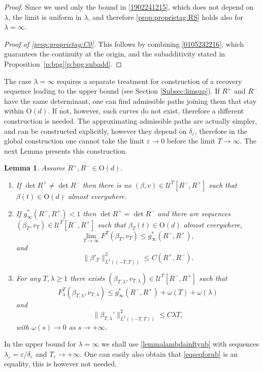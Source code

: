 \documentclass[a4paper,reqno]{amsart}
\newcommand\calU{\mathcal{U}}
\newcommand\eps{{\varepsilon}}
\newtheorem{lemma}[definition]{Lemma}
\theoremstyle{remark}
\newcommand{\On}{\mathrm{O}(d)}
\numberwithin{equation}{section}
\begin{document}
\begin{proof}
Since we used only the bound in
\eqref{1902241215}, which does not depend on $\lambda$, the limit is uniform in $\lambda$, and therefore \ref{prop:proprietag:RS} holds also for $\lambda=\infty$.
\medskip

\noindent \textit{Proof of \ref{prop:proprietag:C0}.} This follows by combining \eqref{0105232216}, which guarantees the continuity at the origin, and the subadditivity stated in
Proposition~\ref{p:bpg}\ref{p:bpg:subadd}.
\end{proof}


The case $\lambda=\infty$ requires a separate treatment for construction of a recovery sequence leading to the upper bound (see Section \ref{Subsec:limsup}). If $R^+$ and $R^-$ have the same determinant, one can find admissible paths joining them that stay within $\On$. If not, however, such curves do not exist, therefore a different construction is needed. The approximating admissible paths are actually simpler, and can be constructed explicitly, however they depend on $\delta_\eps$, therefore in the global construction one cannot take the limit $\eps\to0$ before the limit $T\to\infty$. The next Lemma presents this construction.
\begin{lemma}\label{lemmalambdainfty}
Assume $R^+, R^-\in\On$.
\begin{enumerate}
\item\label{lemmalambdainftyginfty} If $\det R^+\ne \det R^-$ then
there is no
  $(\beta,v)\in \calU^T[R^-,R^+]$ such that
  $\beta(t)\in \On$ almost everywhere.
 \item\label{lemmalambdainftyson}
 If $g_\infty^*(R^-,R^+)<1$ then
  $\det R^+=\det R^-$ and  there are sequences
  $(\beta_T,v_T)\in \calU^T[R^-,R^+]$ such that
  $\beta_T(t)\in \On$ almost everywhere,
  \begin{equation}
\lim_{T\to\infty} F^T(\beta_T, v_T)\leq    g_\infty^*(R^-,R^+),
  \end{equation}
  and \begin{equation}
           \|\beta'_T\|_{L^2((-T,T))}^2\le C(R^+, R^-).
          \end{equation}
  \item\label{lemmalambdainftyub}
  For any $T,\lambda \ge 1$  there exists $(\beta_{T,\lambda}, v_{T,\lambda})\in\calU^T[R^-,R^+]$ such that
  \begin{equation}\label{eqseqforub}
F^T_{\lambda}(\beta_{T,\lambda}, v_{T,\lambda}) 
   \le g_\infty^*(R^-,R^+) +\omega(T)+\omega(\lambda)
  \end{equation}
and 
\begin{equation}\label{eql2boundbetatla}
 \|\beta_{T,\lambda}'\|_{L^2((-T,T))}^2 \le C\lambda T,
\end{equation}
  with $\omega(s)\to 0$ as $s\to +\infty$.
\end{enumerate}
 \end{lemma}
In the upper bound for $\lambda=\infty$ we shall use \ref{lemmalambdainftyub} with sequences $\lambda_\eps=\eps/\delta_\eps$ and
$T_\eps\to +\infty$.
One can easily also obtain that \eqref{eqseqforub} is an equality, this is however not needed.
\end{document}
